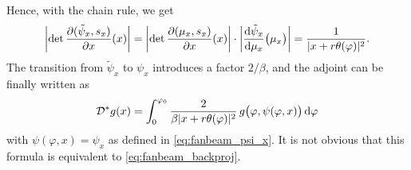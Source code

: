 \documentclass{amsart}
\renewcommand*{\phi}{\varphi}
\begin{document}
%
Hence, with the chain rule, we get
%
\begin{equation*}
 \ABSLR{\DET \frac{\partial(\tilde\psi_x, s_x)}{\partial x} (x)} = \ABSLR{\DET \frac{\partial(\mu_x, s_x)}{\partial x} (x)} \cdot
 \ABSLR{\frac{\D \tilde\psi_x}{\D \mu_x}\big(\mu_x\big)} = \frac{1}{\ABS{x + r\theta(\phi)}^2}.
\end{equation*}
%
The transition from $\tilde\psi_x$ to $\psi_x$ introduces a factor $2/\beta$, and the adjoint can be finally written as
%
\begin{equation}
 \label{eq:fanbeam_backproj_alt}
 \OPD^* g(x) = \int_0^{\phi_0} \frac{2}{\beta \ABS{x + r\theta(\phi)}^2}\, g\big(\phi, \psi(\phi, x)\big)\, \D \phi
\end{equation}
%
with $\psi(\phi, x) = \psi_x$ as defined in \eqref{eq:fanbeam_psi_x}. It is not obvious that this formula is equivalent to 
\eqref{eq:fanbeam_backproj}.
\end{document}
